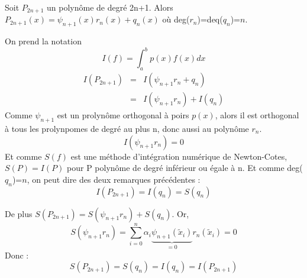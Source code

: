\begin{dem}
	Soit $P_{2n+1}$ un polynôme de degré 2n+1. Alors $P_{2n+1}(x)=\psi_{n+1}(x)r_n(x)+q_n(x)$ où deg($r_n$)=deq($q_n$)=$n$.

	On prend la notation \[I(f)=\int_a^b p(x)f(x)dx\]
	\begin{eqnarray*}
		I(P_{2n+1})&=&I(\psi_{n+1}r_n + q_n) \\
			   &=&I(\psi_{n+1}r_n) + I(q_n)
	\end{eqnarray*}
	Comme $\psi_{n+1}$ est un prolynôme orthogonal à poirs $p(x)$, alors il est orthogonal à tous les prolynpomes de degré au plus n, donc aussi au polynôme $r_n$.
	\[I(\psi_{n+1}r_n)=0\]
	Et comme $S(f)$ est une méthode d'intégration numérique de Newton-Cotes, $S(P)=I(P)$ pour P polynôme de degré inférieur ou égale à n. Et comme deg($q_n$)=$n$, on peut dire des deux remarques précédentes :
	\[I(P_{2n+1})=I(q_n)=S(q_n)\]

	De plus $S(P_{2n+1})=S(\psi_{n+1}r_n) + S(q_n)$. Or,
	\[S(\psi_{n+1}r_n) = \sum_{i=0}^n \alpha_i \underbrace{\psi_{n+1}(\tilde{x}_i)}_{=0} r_n(\tilde{x}_i) = 0\]
	Donc :
	\[S(P_{2n+1})=S(q_n)=I(q_n)=I(P_{2n+1})\]
\end{dem}
